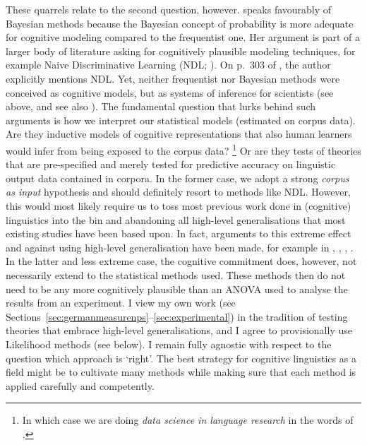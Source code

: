 \documentclass[USenglish]{article}
\begin{document}
These quarrels relate to the second question, however.
\citet[301--302]{Divjak2016a} speaks favourably of Bayesian methods because the Bayesian concept of probability is more adequate for cognitive modeling compared to the frequentist one.
Her argument is part of a larger body of literature asking for cognitively plausible modeling techniques, for example Naive Discriminative Learning (NDL; \citealp{Baayen2011,BaayenEa2013,MilinEa2016,TheijssenEa2013}). 
On p.\ 303 of \cite{Divjak2016a}, the author explicitly mentions NDL.
Yet, neither frequentist nor Bayesian methods were conceived as cognitive models, but as systems of inference for scientists (see above, and see also \citealp[302]{Divjak2016a}).
The fundamental question that lurks behind such arguments is how we interpret our statistical models (estimated on corpus data).
Are they inductive models of cognitive representations that also human learners would infer from being exposed to the corpus data?%
\footnote{In which case we are doing \textit{data science in language research} in the words of \citealp{MilinEa2016}.}
Or are they tests of theories that are pre-specified and merely tested for predictive accuracy on linguistic output data contained in corpora.
In the former case, we adopt a strong \textit{corpus as input} hypothesis and should definitely resort to methods like NDL.
However, this would most likely require us to toss most previous work done in (cognitive) linguistics into the bin and abandoning all high-level generalisations that most existing studies have been based upon.
In fact, arguments to this extreme effect and against using high-level generalisation have been made, for example in \cite{BaayenEa2016}, \citet[299--300]{Divjak2016a}, \cite{RamscarPort2016}, \cite{TheijssenEa2013}.
In the latter and less extreme case, the cognitive commitment does, however, not necessarily extend to the statistical methods used.
These methods then do not need to be any more cognitively plausible than an ANOVA used to analyse the results from an experiment.
I view my own work (see Sections~\ref{sec:germanmeasurenps}--\ref{sec:experimental}) in the tradition of testing theories that embrace high-level generalisations, and I agree to provisionally use Likelihood methods (see below).
I remain fully agnostic with respect to the question which approach is `right'.
The best strategy for cognitive linguistics as a field might be to cultivate many methods while making sure that each method is applied carefully and competently.
\end{document}
